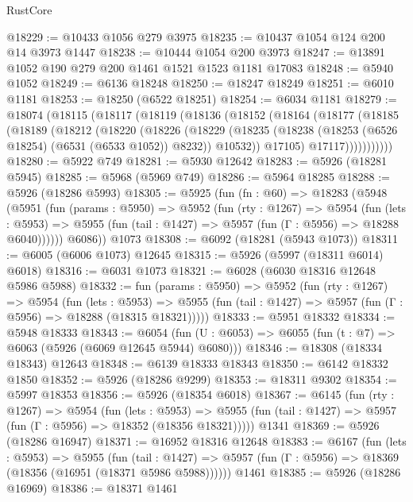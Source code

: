 \begin{lexlean}{RustCore}
\begin{coremodule}
@18229 := @10433 @1056 @279 @3975
@18235 := @10437 @1054 @124 @200 @14 @3973 @1447
@18238 := @10444 @1054 @200 @3973
@18247 := @13891 @1052 @190 @279 @200 @1461 @1521 @1523 @1181 @17083
@18248 := @5940 @1052
@18249 := @6136 @18248
@18250 := @18247 @18249
@18251 := @6010 @1181
@18253 := @18250 (@6522 @18251)
@18254 := @6034 @1181
@18279 := @18074
    (@18115
      (@18117
        (@18119
          (@18136
            (@18152
              (@18164
                (@18177
                  (@18185
                    (@18189
                      (@18212
                        (@18220
                          (@18226
                            (@18229
                              (@18235
                                (@18238 (@18253 (@6526 @18254) (@6531 (@6533 @1052)) @8232))
                                @10532))
                            @17105)
                          @17117)))))))))))
@18280 := @5922 @749
@18281 := @5930 @12642
@18283 := @5926 (@18281 @5945)
@18285 := @5968 (@5969 @749)
@18286 := @5964 @18285
@18288 := @5926 (@18286 @5993)
@18305 := @5925
    (fun (fn : @60) =>
    @18283
      (@5948
        (@5951
          (fun (params : @5950) =>
          @5952
            (fun (rty : @1267) =>
            @5954
              (fun (lets : @5953) =>
              @5955 (fun (tail : @1427) => @5957 (fun (Γ : @5956) => @18288 @6040))))))
        @6086))
    @1073
@18308 := @6092 (@18281 (@5943 @1073))
@18311 := @6005 (@6006 @1073) @12645
@18315 := @5926 (@5997 (@18311 @6014) @6018)
@18316 := @6031 @1073
@18321 := @6028 (@6030 @18316 @12648 @5986 @5988)
@18332 := fun (params : @5950) =>
  @5952
    (fun (rty : @1267) =>
    @5954
      (fun (lets : @5953) =>
      @5955 (fun (tail : @1427) => @5957 (fun (Γ : @5956) => @18288 (@18315 @18321)))))
@18333 := @5951 @18332
@18334 := @5948 @18333
@18343 := @6054
    (fun (U : @6053) => @6055 (fun (t : @7) => @6063 (@5926 (@6069 @12645 @5944) @6080)))
@18346 := @18308 (@18334 @18343) @12643
@18348 := @6139 @18333 @18343
@18350 := @6142 @18332 @1850
@18352 := @5926 (@18286 @9299)
@18353 := @18311 @9302
@18354 := @5997 @18353
@18356 := @5926 (@18354 @6018)
@18367 := @6145
    (fun (rty : @1267) =>
    @5954
      (fun (lets : @5953) =>
      @5955 (fun (tail : @1427) => @5957 (fun (Γ : @5956) => @18352 (@18356 @18321)))))
    @1341
@18369 := @5926 (@18286 @16947)
@18371 := @16952 @18316 @12648
@18383 := @6167
    (fun (lets : @5953) =>
    @5955
      (fun (tail : @1427) =>
      @5957 (fun (Γ : @5956) => @18369 (@18356 (@16951 (@18371 @5986 @5988))))))
    @1461
@18385 := @5926 (@18286 @16969)
@18386 := @18371 @1461

\end{coremodule}
\end{lexlean}
